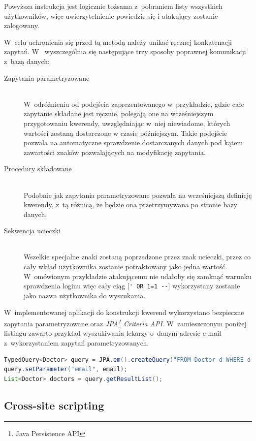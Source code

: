 \documentclass[11pt]{aghdpl}
\begin{document}
Powyższa instrukcja jest logicznie tożsama z~pobraniem listy wszystkich użytkowników, więc uwierzytelnienie powiedzie się i atakujący zostanie zalogowany.

W~celu uchronienia się przed tą metodą należy unikać ręcznej konkatenacji zapytań. W~\cite{sql-injection-prevention-cheat-sheet} wyszczególnia się następujące trzy sposoby poprawnej komunikacji z~bazą danych:

\begin{description}
\item[Zapytania parametryzowane] \hfill \\
W~odróżnieniu od podejścia zaprezentowanego w~przykładzie, gdzie całe zapytanie składane jest ręcznie, polegają one na wcześniejszym przygotowaniu kwerendy, uwzględniając w~niej niewiadome, których wartości zostaną dostarczone w czasie późniejszym. Takie podejście pozwala na automatyczne sprawdzenie dostarczanych danych pod kątem zawartości znaków pozwalających na modyfikację zapytania.
\item[Procedury składowane] \hfill \\
Podobnie jak zapytania parametryzowane pozwala na wcześniejszą definicję kwerendy, z~tą różnicą, że będzie ona przetrzymywana po stronie bazy danych.
\item[Sekwencja ucieczki] \hfill \\
Wszelkie specjalne znaki zostaną poprzedzone przez znak ucieczki, przez co cały wkład użytkownika zostanie potraktowany jako jedna wartość. W~omówionym przykładzie atakującemu nie udałoby się zamknąć warunku sprawdzenia loginu więc cały ciąg [\lstinline$' OR 1=1 --$] wykorzystany zostanie jako nazwa użytkownika do wyszukania.
\end{description}

W~implementowanej aplikacji do konstrukcji kwerend wykorzystano bezpieczne zapytania parametryzowane oraz \emph{JPA\footnote{Java Persistence API} Criteria API}. W~zamieszczonym poniżej listingu zawarto przykład wyszukiwania lekarzy o~danym adresie e-mail z~wykorzystaniem zapytań parametryzowanych.

\begin{lstlisting}[language=Java]
TypedQuery<Doctor> query = JPA.em().createQuery("FROM Doctor d WHERE d.email=:email", Doctor.class);
query.setParameter("email", email);
List<Doctor> doctors = query.getResultList();
\end{lstlisting}

\subsection{Cross-site scripting}
\end{document}
